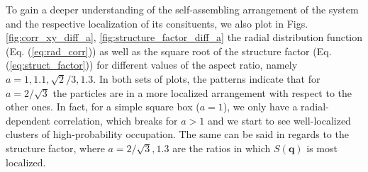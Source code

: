 \documentclass[a4paper, 12pt, oneside]{article}
\begin{document}
To gain a deeper understanding of the self-assembling arrangement of the system and the respective localization of its consituents,
we also plot in Figs. \ref{fig:corr_xy_diff_a}, \ref{fig:structure_factor_diff_a} the radial distribution function 
(Eq. (\ref{eq:rad_corr})) as well as the square root of the structure factor (Eq. (\ref{eq:struct_factor})) for different values 
of the aspect ratio, namely $a=1,1.1,\sqrt{2}/3,1.3$. In both sets of plots, the patterns indicate that for $a=2/\sqrt{3}$ the 
particles are in a more localized arrangement with respect to the other ones. In fact, for a simple square box ($a=1$), we only have a 
radial-dependent correlation, which breaks for $a > 1$ and we start to see well-localized clusters of 
high-probability occupation. The same can be said in regards to the structure factor, where $a=2/\sqrt{3}, 1.3$ are the ratios 
in which $S(\bm{q})$ is most localized.
\end{document}
